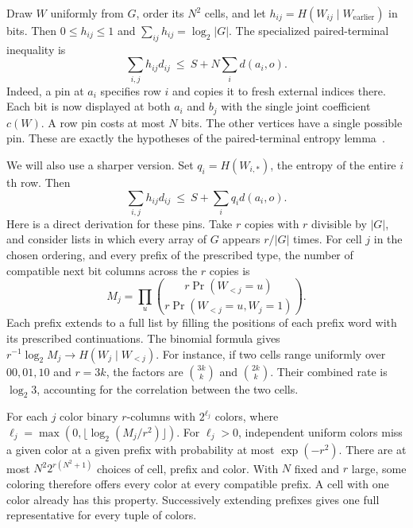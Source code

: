 \documentclass[11pt]{article}
\begin{document}
Draw $W$ uniformly from $G$, order its $N^2$ cells, and let
$h_{ij}=H(W_{ij}\mid W_{\mathrm{earlier}})$ in bits. Then
$0\le h_{ij}\le1$ and $\sum_{ij}h_{ij}=\log_2|G|$. The specialized
paired-terminal inequality is
\begin{equation}\label{eq:pins}
       \sum_{i,j}h_{ij}d_{ij}\ \le\ S+N\sum_i d(a_i,o).
\end{equation}
Indeed, a pin at $a_i$ specifies row $i$ and copies it to fresh external
indices there. Each bit is now displayed at both $a_i$ and $b_j$ with
the single joint coefficient $c(W)$. A row pin costs at most $N$ bits.
The other vertices have a single possible pin. These are exactly the
hypotheses of the paired-terminal entropy lemma~\cite{partial,formalent}.

We will also use a sharper version. Set $q_i=H(W_{i,*})$, the entropy
of the entire $i$th row. Then
\begin{equation}\label{eq:rowpins}
       \sum_{i,j}h_{ij}d_{ij}\ \le\ S+\sum_i q_i d(a_i,o).
\end{equation}
Here is a direct derivation for these pins. Take $r$ copies with $r$
divisible by $|G|$, and consider lists
in which every array of $G$ appears $r/|G|$ times. For cell $j$ in
the chosen ordering, and every prefix of the prescribed type, the
number of compatible next bit columns across the $r$ copies is
\[
 M_j=\prod_{u}\binom{r\Pr(W_{<j}=u)}
                        {r\Pr(W_{<j}=u,W_j=1)}.
\]
Each prefix extends to a full list by filling the positions of each
prefix word with its prescribed continuations. The binomial formula
gives $r^{-1}\log_2 M_j\to H(W_j\mid W_{<j})$. For instance,
if two cells range uniformly over $00,01,10$ and $r=3k$, the factors
are $\binom{3k}{k}$ and $\binom{2k}{k}$. Their combined rate is
$\log_2 3$, accounting for the correlation between the two cells.

For each $j$ color binary $r$-columns with $2^{\ell_j}$ colors, where
$\ell_j=\max(0,\lfloor\log_2(M_j/r^2)\rfloor)$. For $\ell_j>0$,
independent uniform colors miss a given color at a given prefix
with probability at most $\exp(-r^2)$. There are at most
$N^2 2^{r(N^2+1)}$ choices of cell, prefix and color. With $N$ fixed
and $r$ large, some coloring therefore offers every color at every
compatible prefix. A cell with one color already has this property.
Successively extending prefixes gives one full representative for
every tuple of colors.
\end{document}
